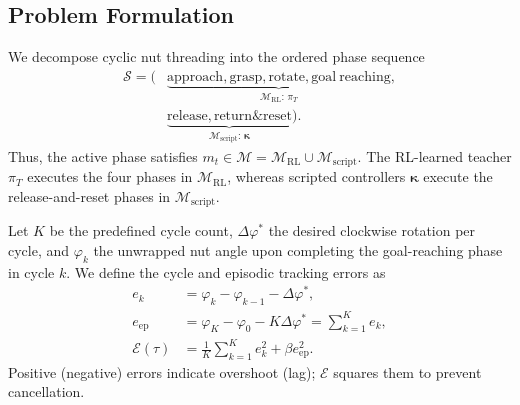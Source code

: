 
\subsection{Problem Formulation}

We decompose cyclic nut threading into the ordered phase sequence
\begin{equation}
  \begin{aligned}
  \mathcal S=\bigl(&
  \underbrace{\mathrm{approach},\mathrm{grasp},\mathrm{rotate},
    \mathrm{goal\ reaching}}_{\mathcal M_{\mathrm{RL}}:\,\pi_T},\\[-0.2em]
  &\underbrace{\mathrm{release},\mathrm{return\&reset}}
    _{\mathcal M_{\mathrm{script}}:\,\boldsymbol\kappa}\bigr).
  \end{aligned}
  \label{eq:cycle_subtasks}
\end{equation}
Thus, the active phase satisfies
$m_t\in\mathcal M=\mathcal M_{\mathrm{RL}}\cup
\mathcal M_{\mathrm{script}}$. The RL-learned teacher $\pi_T$ executes the four
phases in $\mathcal M_{\mathrm{RL}}$, whereas scripted controllers
$\boldsymbol\kappa$ execute the release-and-reset phases in
$\mathcal M_{\mathrm{script}}$.

Let $K$ be the predefined cycle count, $\Delta\varphi^*$ the desired clockwise
rotation per cycle, and $\varphi_k$ the unwrapped nut angle upon completing the
goal-reaching phase in cycle $k$. We define the cycle and episodic tracking errors as
\begin{equation}
  \begin{aligned}
  e_k&=\varphi_k-\varphi_{k-1}-\Delta\varphi^*,\\
  e_{\mathrm{ep}}&=\varphi_K-\varphi_0-K\Delta\varphi^*
                    =\sum_{k=1}^{K}e_k,\\
  \mathcal E(\tau)&=\frac{1}{K}\sum_{k=1}^{K}e_k^2
                     +\beta e_{\mathrm{ep}}^2.
  \end{aligned}
  \label{eq:tracking_errors}
\end{equation}
Positive (negative) errors indicate overshoot (lag); $\mathcal E$ squares them
to prevent cancellation.

